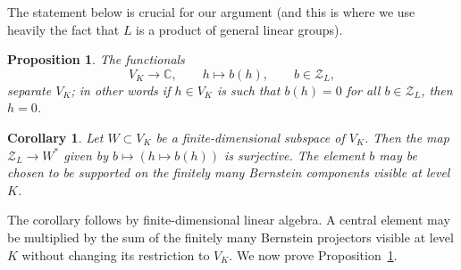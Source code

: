 \documentclass[11pt,a4paper]{amsart}
\newcommand{\mcZ}{\mathcal Z}
\newtheorem{proposition}[theorem]{Proposition}
\newtheorem{corollary}[theorem]{Corollary}
\theoremstyle{definition}
\theoremstyle{remark}
\begin{document}
The statement below is crucial for our argument (and this is where we use heavily the fact that $L$ is a product of general linear groups). 
\begin{proposition}\label{P:bern-interpolation}
The functionals
$$
 V_K\longrightarrow\mathbb C,\qquad
 h\longmapsto b(h),\qquad b\in\mcZ_L,
$$
separate $V_K$; in other words if $h\in V_K$ is such that $b(h)=0$ for all $b\in \mcZ_L$, then $h=0$.
\end{proposition}
\begin{corollary}\label{C:fdim}
Let $W\subset V_K$ be a finite-dimensional subspace of $V_K$. Then the map $\mcZ_L\to W^*$ given by $b\mapsto(h\mapsto b(h))$ is surjective.
The element $b$ may be chosen to be supported on the finitely many Bernstein components visible at level $K$.
\end{corollary}
The corollary follows by finite-dimensional linear algebra. A central
element may be multiplied by the sum of the finitely many Bernstein
projectors visible at level $K$ without changing its restriction to $V_K$.
We now prove Proposition~\ref{P:bern-interpolation}.
\end{document}
